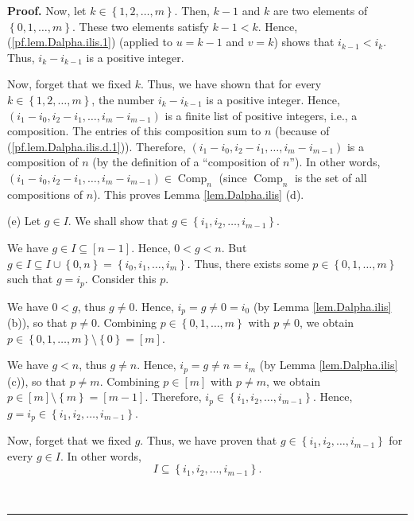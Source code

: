 \documentclass[numbers=enddot,12pt,final,onecolumn,notitlepage,abstracton]{scrartcl}
\theoremstyle{definition}
\newenvironment{proof}[1][Proof]{\noindent\textbf{#1.} }{\ \rule{0.5em}{0.5em}}
\newenvironment{verlong}{}{}
\begin{document}
\begin{verlong}
\begin{footnotesize}
\begin{proof}
Now, let $k\in\left\{  1,2,\ldots,m\right\}  $. Then, $k-1$ and $k$ are two
elements of $\left\{  0,1,\ldots,m\right\}  $. These two elements satisfy
$k-1<k$. Hence, (\ref{pf.lem.Dalpha.ilis.1}) (applied to $u=k-1$ and $v=k$)
shows that $i_{k-1}<i_{k}$. Thus, $i_{k}-i_{k-1}$ is a positive integer.

Now, forget that we fixed $k$. Thus, we have shown that for every
$k\in\left\{  1,2,\ldots,m\right\}  $, the number $i_{k}-i_{k-1}$ is a
positive integer. Hence, $\left(  i_{1}-i_{0},i_{2}-i_{1},\ldots,i_{m}%
-i_{m-1}\right)  $ is a finite list of positive integers, i.e., a composition.
The entries of this composition sum to $n$ (because of
(\ref{pf.lem.Dalpha.ilis.d.1})). Therefore, $\left(  i_{1}-i_{0},i_{2}%
-i_{1},\ldots,i_{m}-i_{m-1}\right)  $ is a composition of $n$ (by the
definition of a \textquotedblleft composition of $n$\textquotedblright). In
other words, $\left(  i_{1}-i_{0},i_{2}-i_{1},\ldots,i_{m}-i_{m-1}\right)
\in\operatorname*{Comp}\nolimits_{n}$ (since $\operatorname*{Comp}%
\nolimits_{n}$ is the set of all compositions of $n$). This proves Lemma
\ref{lem.Dalpha.ilis} (d).

(e) Let $g\in I$. We shall show that $g\in\left\{  i_{1},i_{2},\ldots
,i_{m-1}\right\}  $.

We have $g\in I\subseteq\left[  n-1\right]  $. Hence, $0<g<n$. But $g\in
I\subseteq I\cup\left\{  0,n\right\}  =\left\{  i_{0},i_{1},\ldots
,i_{m}\right\}  $. Thus, there exists some $p\in\left\{  0,1,\ldots,m\right\}
$ such that $g=i_{p}$. Consider this $p$.

We have $0<g$, thus $g\neq0$. Hence, $i_{p}=g\neq0=i_{0}$ (by Lemma
\ref{lem.Dalpha.ilis} (b)), so that $p\neq0$. Combining $p\in\left\{
0,1,\ldots,m\right\}  $ with $p\neq0$, we obtain $p\in\left\{  0,1,\ldots
,m\right\}  \setminus\left\{  0\right\}  =\left[  m\right]  $.

We have $g<n$, thus $g\neq n$. Hence, $i_{p}=g\neq n=i_{m}$ (by Lemma
\ref{lem.Dalpha.ilis} (c)), so that $p\neq m$. Combining $p\in\left[
m\right]  $ with $p\neq m$, we obtain $p\in\left[  m\right]  \setminus\left\{
m\right\}  =\left[  m-1\right]  $. Therefore, $i_{p}\in\left\{  i_{1}%
,i_{2},\ldots,i_{m-1}\right\}  $. Hence, $g=i_{p}\in\left\{  i_{1}%
,i_{2},\ldots,i_{m-1}\right\}  $.

Now, forget that we fixed $g$. Thus, we have proven that $g\in\left\{
i_{1},i_{2},\ldots,i_{m-1}\right\}  $ for every $g\in I$. In other words,%
\begin{equation}
I\subseteq\left\{  i_{1},i_{2},\ldots,i_{m-1}\right\}  .
\label{pf.lem.Dalpha.ilis.e.dir1}%
\end{equation}



\end{proof}
\end{footnotesize}
\end{verlong}
\end{document}
